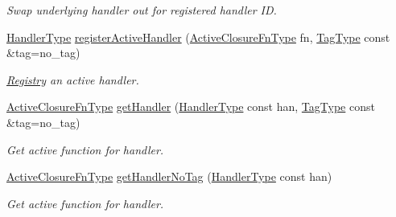 \begin{DoxyCompactItemize}
\begin{DoxyCompactList}\small\item\em Swap underlying handler out for registered handler ID. \end{DoxyCompactList}\item 
\hyperlink{namespacevt_af64846b57dfcaf104da3ef6967917573}{Handler\+Type} \hyperlink{structvt_1_1registry_1_1_registry_ad4fdbf2cfbe4e852c5556435efe4255f}{register\+Active\+Handler} (\hyperlink{namespacevt_a2a06c34cafcd511828f16cbf1476b924}{Active\+Closure\+Fn\+Type} fn, \hyperlink{namespacevt_a84ab281dae04a52a4b243d6bf62d0e52}{Tag\+Type} const \&tag=no\+\_\+tag)
\begin{DoxyCompactList}\small\item\em \hyperlink{structvt_1_1registry_1_1_registry}{Registry} an active handler. \end{DoxyCompactList}\item 
\hyperlink{namespacevt_a2a06c34cafcd511828f16cbf1476b924}{Active\+Closure\+Fn\+Type} \hyperlink{structvt_1_1registry_1_1_registry_a01d56f18c894b21f27a798d0fd012b80}{get\+Handler} (\hyperlink{namespacevt_af64846b57dfcaf104da3ef6967917573}{Handler\+Type} const han, \hyperlink{namespacevt_a84ab281dae04a52a4b243d6bf62d0e52}{Tag\+Type} const \&tag=no\+\_\+tag)
\begin{DoxyCompactList}\small\item\em Get active function for handler. \end{DoxyCompactList}\item 
\hyperlink{namespacevt_a2a06c34cafcd511828f16cbf1476b924}{Active\+Closure\+Fn\+Type} \hyperlink{structvt_1_1registry_1_1_registry_ae5bbdd48ff66c6d64af9f03076374070}{get\+Handler\+No\+Tag} (\hyperlink{namespacevt_af64846b57dfcaf104da3ef6967917573}{Handler\+Type} const han)
\begin{DoxyCompactList}\small\item\em Get active function for handler. \end{DoxyCompactList}\end{DoxyCompactItemize}

